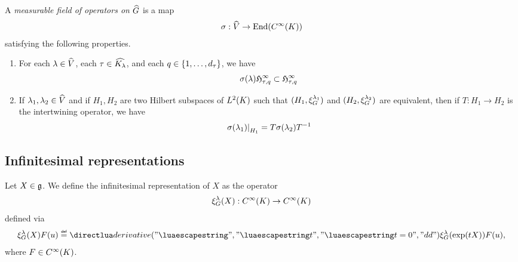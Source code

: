 \begin{definition}
    A \emph{measurable field of operators on ${\widehat{G}}$} is a map
    \begin{align*}
        \sigma : {\widehat{V}} \to \operatorname{End}({C^\infty(K)})
    \end{align*}
    satisfying the following properties.
    \begin{enumerate}
        \item For each $\lambda \in {\widehat{V}}$,
            each $\tau \in {\widehat{{{K}_{\lambda}}}}$, and each $q \in \{1, \dots, {d_{\tau}}\}$, we have
            \begin{align*}
                \sigma(\lambda) \mathfrak{H}_{\tau, q}^\infty \subset \mathfrak{H}_{\tau, q}^\infty
            \end{align*}
        \item If $\lambda_1, \lambda_2 \in {\widehat{V}}$ and if $H_1, H_2$ are two Hilbert subspaces of ${L^{2} (K)}$ such that
            $(H_1, \xi^{\lambda_1}_{G})$ and $(H_2, \xi^{\lambda_2}_{G})$ are equivalent,
            then if $T : H_1 \to H_2$ is the intertwining operator,
            we have
            \begin{align*}
                \left. \sigma(\lambda_1) \right|_{H_1}  = T \sigma(\lambda_2) T^{-1}
            \end{align*}
    \end{enumerate}
\end{definition}

\subsection{Infinitesimal representations}

\begin{definition}
\label{definition:infinitesimal_representation}
    Let $X \in \mathfrak{g}$.
    We define the infinitesimal representation of $X$ as the operator
    \begin{align*}
        \xi^{\lambda}_{G}(X) : {C^\infty(K)} \to {C^\infty(K)}
    \end{align*}
    defined via
    \begin{align*}
        \Rep{\lambda}(X) F(u) \defeq \D*{t}<t=0> \Rep{\lambda}(\exp(t X)) F(u),
    \end{align*}
    where $F \in {C^\infty(K)}$.
\end{definition}

